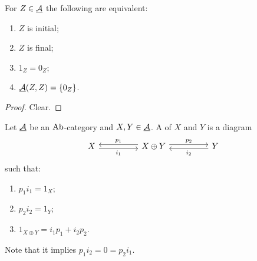 \begin{proposition*}
	For \( Z \in \underline{\mathcal{A}} \) the following are equivalent:
	\begin{enumerate}
		\item \( Z \) is initial;
		\item \( Z \) is final;
		\item \( 1_Z = 0_Z \);
		\item \( \underline{\mathcal{A}}(Z, Z) = \{0_Z\} \).
	\end{enumerate}
\end{proposition*}
\begin{proof}
	Clear.
\end{proof}

\begin{definition*}
	Let \( \underline{\mathcal{A}} \) be an \( \mathrm{Ab} \)-category and \( X, Y \in \underline{\mathcal{A}} \). A  of \( X \) and \( Y \) is a diagram
	\[
		\begin{tikzcd}
			X && {X \oplus Y} && Y
			\arrow["{i_1}"', shift right, from=1-1, to=1-3]
			\arrow["{p_1}"', shift right, from=1-3, to=1-1]
			\arrow["{p_2}", shift left, from=1-3, to=1-5]
			\arrow["{i_2}", shift left, from=1-5, to=1-3]
		\end{tikzcd}
	\]
	such that:
	\begin{enumerate}
		\item \( p_1 i_1 = 1_X \);
		\item \( p_2 i_2 = 1_Y \);
		\item \( 1_{X \oplus Y} = i_1 p_1 + i_2 p_2 \).
	\end{enumerate}
	Note that it implies \( p_1 i_2 = 0 = p_2 i_1 \).
\end{definition*}

